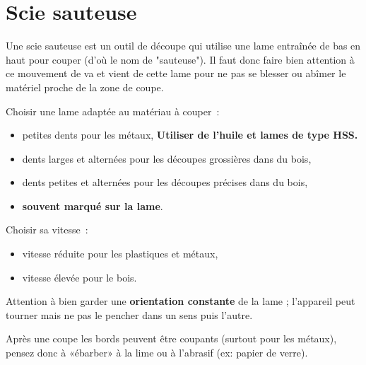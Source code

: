 \section*{Scie sauteuse} %
Une scie sauteuse est un outil de découpe qui utilise une lame entraînée de bas en haut pour couper (d'où le nom de "sauteuse"). Il faut donc faire bien attention à ce mouvement de va et vient de cette lame pour ne pas se blesser ou abîmer le matériel proche de la zone de coupe.

Choisir une lame adaptée au matériau à couper~:
\begin{itemize}
\item petites dents pour les métaux, \textbf{Utiliser de l'huile et lames de type HSS.}
\item dents larges et alternées pour les découpes grossières dans du bois,
\item dents petites et alternées pour les découpes précises dans du bois,
\item \textbf{souvent marqué sur la lame}.
\end{itemize}

Choisir sa vitesse~:
\begin{itemize}
\item vitesse réduite pour les plastiques et métaux,
\item vitesse élevée pour le bois.
\end{itemize}

Attention à bien garder une \textbf{orientation constante} de la lame ; l'appareil peut tourner mais ne pas le pencher dans un sens puis l'autre.

Après une coupe les bords peuvent être coupants (surtout pour les métaux), pensez donc à «ébarber» à la lime ou à l'abrasif (ex: papier de verre).
